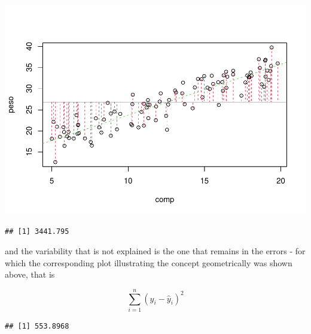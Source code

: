 \documentclass[
]{book}
\newenvironment{Shaded}{\begin{snugshade}}{\end{snugshade}}
\newcommand{\DecValTok}[1]{\textcolor[rgb]{0.00,0.00,0.81}{#1}}
\newcommand{\FunctionTok}[1]{\textcolor[rgb]{0.13,0.29,0.53}{\textbf{#1}}}
\newcommand{\NormalTok}[1]{#1}
\newcommand{\OtherTok}[1]{\textcolor[rgb]{0.56,0.35,0.01}{#1}}
\newcommand{\SpecialCharTok}[1]{\textcolor[rgb]{0.81,0.36,0.00}{\textbf{#1}}}
\begin{document}
\includegraphics{ECOMODbook_files/figure-latex/a6.14-1.pdf}

\begin{Shaded}
\end{Shaded}

\begin{verbatim}
## [1] 3441.795
\end{verbatim}

and the variability that is not explained is the one that remains in the errors - for which the corresponding plot illustrating the concept geometrically was shown above, that is

\[\sum_{i=1}^n (y_i- \hat y_i)^2\]

\begin{Shaded}
\end{Shaded}

\begin{verbatim}
## [1] 553.8968
\end{verbatim}
\end{document}
